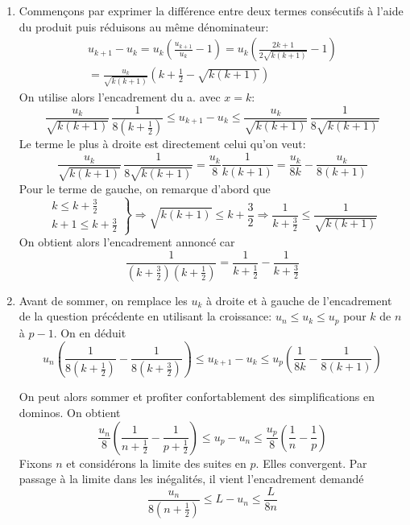 \begin{enumerate}
\begin{enumerate}
 \item Commençons par exprimer la différence entre deux termes consécutifs à l'aide du produit puis réduisons au même dénominateur:
\begin{multline*}
 u_{k+1}-u_k=u_k\left(\frac{u_{k+1}}{u_k}-1 \right)
= u_k\left( \frac{2k+1}{2\sqrt{k(k+1)}}-1\right)\\
=\frac{u_k}{\sqrt{k(k+1)}}\left( k+\frac{1}{2} -\sqrt{k(k+1)}\right)   
\end{multline*}
On utilise alors l'encadrement du a. avec $x=k$:
\begin{displaymath}
\frac{u_k}{\sqrt{k(k+1)}}\,\frac{1}{8(k+\frac{1}{2})} 
\leq u_{k+1}-u_k\leq
\frac{u_k}{\sqrt{k(k+1)}}\,\frac{1}{8\sqrt{k(k+1)}}
\end{displaymath}
Le terme le plus à droite est directement celui qu'on veut:
\begin{displaymath}
 \frac{u_k}{\sqrt{k(k+1)}}\,\frac{1}{8\sqrt{k(k+1)}}=\frac{u_k}{8}\frac{1}{k(k+1)}=\frac{u_k}{8k}-\frac{u_k}{8(k+1)}
\end{displaymath}
Pour le terme de gauche, on remarque d'abord que
\begin{displaymath}
 \left. 
\begin{aligned}
 k\leq k+ \frac{3}{2}\\ k+1 \leq k+ \frac{3}{2}
\end{aligned}
\right\rbrace 
\Rightarrow \sqrt{k(k+1)} \leq k+ \frac{3}{2}
\Rightarrow \frac{1}{k+ \frac{3}{2}}\leq \frac{1}{\sqrt{k(k+1)}}
\end{displaymath}
On obtient alors l'encadrement annoncé car
\begin{displaymath}
\frac{1}{(k+\frac{3}{2})(k+\frac{1}{2})}
= \frac{1}{k+\frac{1}{2}} - \frac{1}{k+\frac{3}{2}}
\end{displaymath}

 \item Avant de sommer, on remplace les $u_k$ à droite et à gauche de l'encadrement de la question précédente en utilisant la croissance: $u_n \leq u_k \leq u_p$ pour $k$ de $n$ à $p-1$. On en déduit 
\begin{displaymath}
u_n\left( \frac{1}{8(k+\frac{1}{2})}  - \frac{1}{8(k+\frac{3}{2})}\right)
\leq u_{k+1} - u_k \leq
u_p\left( \frac{1}{8k} - \frac{1}{8(k+1)}\right) 
\end{displaymath}

On peut alors sommer et profiter confortablement des simplifications en dominos. On obtient
\begin{displaymath}
\frac{u_n}{8}\left(\frac{1}{n+\frac{1}{2}}-\frac{1}{p+\frac{1}{2}} \right) 
\leq u_p - u_n \leq
\frac{u_{p}}{8}\left(\frac{1}{n}-\frac{1}{p} \right) 
\end{displaymath}
Fixons $n$ et considérons la limite des suites en $p$. Elles convergent. Par passage à la limite dans les inégalités, il vient l'encadrement demandé
\begin{displaymath}
 \frac{u_n}{8(n+\frac{1}{2})}\leq L - u_n \leq \frac{L}{8n}
\end{displaymath}


\end{enumerate}
\end{enumerate}
